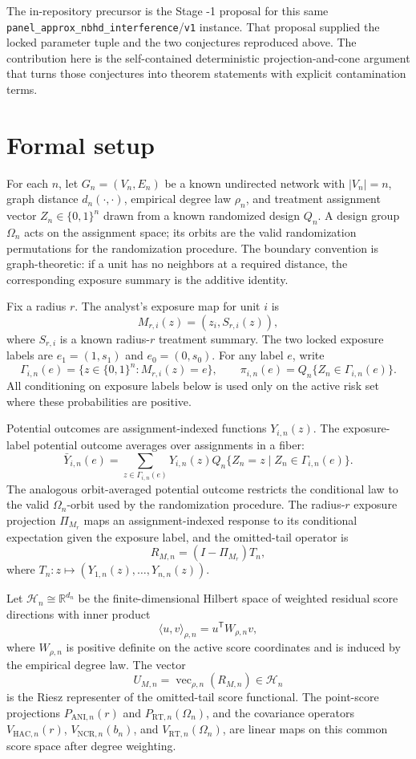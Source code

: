 \documentclass[11pt]{article}
\newcommand{\transpose}{\mathsf{T}}
\newcommand{\R}{\mathbb{R}}
\theoremstyle{definition}
\theoremstyle{plain}
\theoremstyle{remark}
\begin{document}
The in-repository precursor is the Stage -1 proposal for this same
\texttt{panel\_approx\_nbhd\_interference}/\texttt{v1} instance.  That
proposal supplied the locked parameter tuple and the two conjectures reproduced
above.  The contribution here is the self-contained deterministic
projection-and-cone argument that turns those conjectures into theorem
statements with explicit contamination terms.

\section{Formal setup}
For each \(n\), let \(G_n=(V_n,E_n)\) be a known undirected network with
\(|V_n|=n\), graph distance \(d_n(\cdot,\cdot)\), empirical degree law
\(\rho_n\), and treatment assignment vector \(Z_n\in\{0,1\}^n\) drawn from a
known randomized design \(Q_n\).  A design group \(\Omega_n\) acts on the
assignment space; its orbits are the valid randomization permutations for the
randomization procedure.  The boundary convention is graph-theoretic: if a
unit has no neighbors at a required distance, the corresponding exposure
summary is the additive identity.

Fix a radius \(r\).  The analyst's exposure map for unit \(i\) is
\[
  M_{r,i}(z)=(z_i,S_{r,i}(z)),
\]
where \(S_{r,i}\) is a known radius-\(r\) treatment summary.  The two locked
exposure labels are \(e_1=(1,s_1)\) and \(e_0=(0,s_0)\).  For any label \(e\),
write
\[
  \Gamma_{i,n}(e)=\{z\in\{0,1\}^n:M_{r,i}(z)=e\},\qquad
  \pi_{i,n}(e)=Q_n\{Z_n\in\Gamma_{i,n}(e)\}.
\]
All conditioning on exposure labels below is used only on the active risk set
where these probabilities are positive.

Potential outcomes are assignment-indexed functions \(Y_{i,n}(z)\).  The
exposure-label potential outcome averages over assignments in a fiber:
\[
  \bar Y_{i,n}(e)
  =
  \sum_{z\in\Gamma_{i,n}(e)}
  Y_{i,n}(z)Q_n\{Z_n=z\mid Z_n\in\Gamma_{i,n}(e)\}.
\]
The analogous orbit-averaged potential outcome restricts the conditional law
to the valid \(\Omega_n\)-orbit used by the randomization procedure.  The
radius-\(r\) exposure projection \(\Pi_{M_r}\) maps an assignment-indexed
response to its conditional expectation given the exposure label, and the
omitted-tail operator is
\[
  R_{M,n}=(I-\Pi_{M_r})T_n,
\]
where \(T_n:z\mapsto (Y_{1,n}(z),\ldots,Y_{n,n}(z))\).

Let \(\mathcal H_n\cong\R^{d_n}\) be the finite-dimensional Hilbert space of
weighted residual score directions with inner product
\[
  \langle u,v\rangle_{\rho,n}=u^{\transpose}W_{\rho,n}v,
\]
where \(W_{\rho,n}\) is positive definite on the active score coordinates and
is induced by the empirical degree law.  The vector
\[
  U_{M,n}=\operatorname{vec}_{\rho,n}(R_{M,n})\in\mathcal H_n
\]
is the Riesz representer of the omitted-tail score functional.  The
point-score projections \(P_{\mathrm{ANI},n}(r)\) and
\(P_{\mathrm{RT},n}(\Omega_n)\), and the covariance operators
\(V_{\mathrm{HAC},n}(r)\), \(V_{\mathrm{NCR},n}(b_n)\), and
\(V_{\mathrm{RT},n}(\Omega_n)\), are linear maps on this common score space
after degree weighting.
\end{document}
